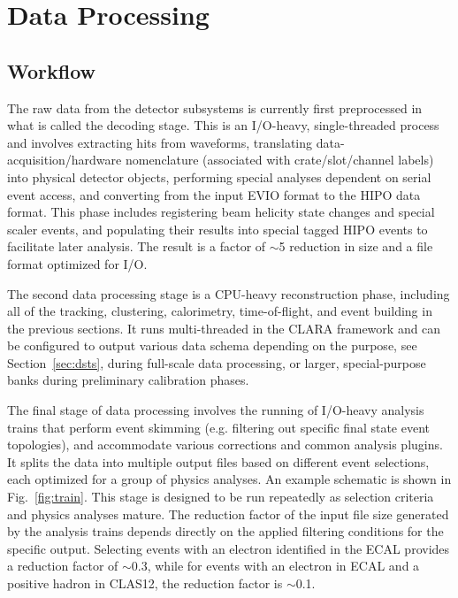 \section{Data Processing}
\label{sec:dataproc}

\subsection{Workflow}

The raw data from the detector subsystems is currently first preprocessed in what is called the decoding
stage. This is an I/O-heavy, single-threaded process and involves extracting hits from waveforms, translating
data-acquisition/hardware nomenclature (associated with crate/slot/channel labels) into physical detector objects,
performing special analyses dependent on serial event access, and converting from the input EVIO format to the
HIPO data format.  This phase includes registering beam helicity state changes and special scaler events, and
populating their results into special tagged HIPO events to facilitate later analysis.  The result is a factor of
$\sim$5 reduction in size and a file format optimized for I/O.

The second data processing stage is a CPU-heavy reconstruction phase, including all of the tracking, clustering,
calorimetry, time-of-flight, and event building in the previous sections.  It runs multi-threaded in the CLARA
framework and can be configured to output various data schema depending on the purpose, see
Section~\ref{sec:dsts}, during full-scale data processing, or larger, special-purpose banks during preliminary
calibration phases.

The final stage of data processing involves the running of I/O-heavy analysis trains that perform event skimming
(e.g. filtering out specific final state event topologies),  and accommodate various corrections and common analysis
plugins.  It splits the data into multiple output files based on different event selections, each optimized for a
group of physics analyses. An example schematic is shown in Fig.~\ref{fig:train}. This stage is designed to be run
repeatedly as selection criteria and physics analyses mature. The reduction factor of the input file size generated
by the analysis trains depends directly on the applied filtering conditions for the specific output. Selecting events
with an electron identified in the ECAL provides a reduction factor of $\sim$0.3, while for events with an electron
in ECAL and a positive hadron in CLAS12, the reduction factor is $\sim$0.1.

